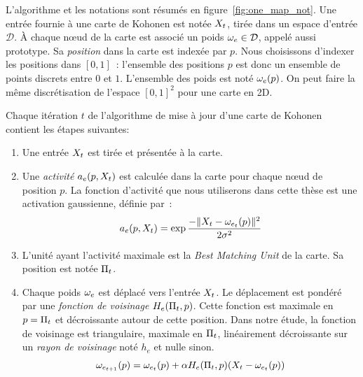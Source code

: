 \documentclass[../main]{subfiles}
\begin{document}
L'algorithme et les notations sont résumés en figure~\ref{fig:one_map_not}. Une entrée fournie à une carte de Kohonen est notée $X_t$, tirée dans un espace d'entrée $\mathcal{D}$. \`A chaque n\oe{}ud de la carte est associé un poids $\omega_e \in \mathcal{D}$, appelé aussi prototype. Sa \emph{position} dans la carte est indexée par $p$. Nous choisissons d'indexer les positions dans $[0,1]$~: l'ensemble des positions $p$ est donc un ensemble de points discrets entre $0$ et $1$. L'ensemble des poids est noté $\omega_e(p)$. On peut faire la même discrétisation de l'espace $[0,1]^2$ pour une carte en 2D.

Chaque itération $t$ de l'algorithme de mise à jour d'une carte de Kohonen contient les étapes suivantes:
\begin{enumerate}
\item\label{enum:inp} Une entrée $X_t$ est tirée et présentée à la carte.
\item\label{enum:act} Une \emph{activité} $a_e(p,X_t)$ est calculée dans la carte pour chaque n\oe{}ud de position $p$. La fonction d'activité que nous utiliserons dans cette thèse est une activation gaussienne, définie par~:
\begin{equation}\label{eq:act1som}
a_e(p, X_t) = \exp{\frac{-\lVert X_t-\omega_{e_t}(p) \rVert ^2}{2\sigma^2}}
\end{equation}
\item\label{enum:bmu} L'unité ayant l'activité maximale est la \emph{Best Matching Unit} de la carte. Sa position est notée $\Pi_t$.
\item Chaque poids $\omega_e$ est déplacé vers l'entrée $X_t$. Le déplacement est pondéré par une \emph{fonction de voisinage} $H_e(\Pi_t,p)$. Cette fonction est maximale en $p = \Pi_t$ et décroissante autour de cette position. Dans notre étude, la fonction de voisinage est triangulaire, maximale en $\Pi_t$, linéairement décroissante sur un \emph{rayon de voisinage} noté $h_e$ et nulle sinon.
\begin{equation}
\omega_{e_{t+1}}(p) = \omega_{e_t}(p) + \alpha H_e(\Pi_t,p)(X_t - \omega_{e_t}(p))
\label{eq:update}
\end{equation}
\end{enumerate}
\end{document}
